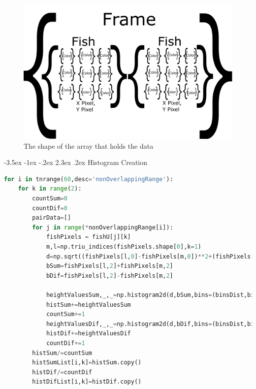 \documentclass{article}
\makeatletter
\renewcommand\section{\clearpage\newpage\@startsection {section}{1}{\z@}%
	{-3.5ex \@plus -1ex \@minus -.2ex}%
	{2.3ex \@plus.2ex}%
	{\normalfont\Large\bfseries}}
\makeatother
\begin{document}
\begin{figure}[H]
	\centering
	\includegraphics[width=\linewidth]{array}
	\caption{The shape of the array that holds the data}
	\label{fig:array}
\end{figure}


\section{Histogram Creation}
\label{app:histCreator}

\begin{lstlisting}[language=Python]
for i in tnrange(60,desc='nonOverlappingRange'):
    for k in range(2):
        countSum=0
        countDif=0
        pairData=[]
        for j in range(*nonOverlappingRange[i]):
            fishPixels = fishU[j][k]
            m,l=np.triu_indices(fishPixels.shape[0],k=1)
            d=np.sqrt((fishPixels[l,0]-fishPixels[m,0])**2+(fishPixels[l,1]-fishPixels[m,1])**2)
            bSum=fishPixels[l,2]+fishPixels[m,2]
            bDif=fishPixels[l,2]-fishPixels[m,2]

            heightValuesSum,_,_=np.histogram2d(d,bSum,bins=(binsDist,binsSum))
            histSum+=heightValuesSum
            countSum+=1
            heightValuesDif,_,_=np.histogram2d(d,bDif,bins=(binsDist,binsDif))
            histDif+=heightValuesDif
            countDif+=1
        histSum/=countSum
        histSumList[i,k]=histSum.copy()
        histDif/=countDif
        histDifList[i,k]=histDif.copy()
\end{lstlisting}




\end{document}
